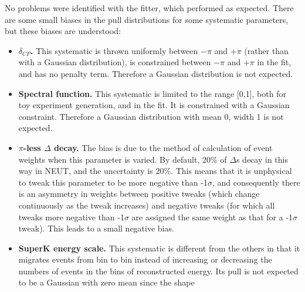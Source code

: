 No problems were identified with the fitter, which performed as expected.
There are some small biases in the pull distributions for some systematic parameters, but these biases are understood:
\begin{itemize}
\item {\bf \boldmath$\delta_{CP}$.}
  This systematic is thrown uniformly between $-\pi$ and $+\pi$ (rather than with a Gaussian distribution),
  is constrained between $-\pi$ and $+\pi$ in the fit,
  and has no penalty term. Therefore a Gaussian distribution is not expected.
\item {\bf Spectral function.}
  This systematic is limited to the range [0,1], both for toy experiment generation,
  and in the fit.
  It is constrained with a Gaussian constraint.
  Therefore a Gaussian distribution with mean 0, width 1 is not expected.
\item {\bf $\pi$-less $\Delta$ decay.}
  The bias is due to the method of calculation of event 
  weights when this parameter is varied. By default, 20\% of $\Delta$s decay in this way in NEUT, and the uncertainty 
  is 20\%. This means that it is unphysical to tweak this parameter to be more negative than -1$\sigma$, and 
  consequently there is an asymmetry in weights between positive tweaks (which change continuously as the tweak 
  increases) and negative tweaks (for which all tweaks more negative than -1$\sigma$ are assigned the same weight 
  as that for a -1$\sigma$ tweak).
  This leads to a small negative bias.
\item {\bf SuperK energy scale.}
  This systematic is different from the others in that it migrates events from bin to bin instead of increasing or decreasing the 
  numbers of events in the bins of reconstructed energy. Its pull is not expected to be a Gaussian with zero mean since the shape 

\end{itemize}
